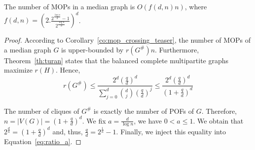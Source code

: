 \documentclass[a4paper,UKenglish,numberwithinsect,cleveref, autoref]{lipics-v2021}
\newcommand{\card}[1]{\left| #1 \right|}
\begin{document}
\begin{corollary}
The number of MOPs in a median graph is $O(f(d,n)n)$, where $f(d,n) = \left(2.\frac{2^{\frac{\log n}{d}}-1}{2^{\frac{\log n}{d}}}\right)^d$.
\label{co:number_mops}
\end{corollary}
\begin{proof}
According to Corollary~\ref{co:mop_crossing_teaser}, the number of MOPs of a median graph $G$ is upper-bounded by $r(G^{\#})n$. Furthermore, Theorem~\ref{th:turan} states that the balanced complete multipartite graphs maximize $r(H)$. Hence,
\begin{equation}
    r(G^{\#})\le \frac{2^d(\frac{q}{d})^d}{\sum_{j=0}^d \binom{d}{j}(\frac{q}{d})^j} \le \frac{2^d(\frac{q}{d})^d}{(1+\frac{q}{d})^d}
    \label{eq:ratio_a}
\end{equation}

The number of cliques of $G^{\#}$ is exactly the number of POFs of $G$. Therefore, $n = \card{V(G)} = (1+\frac{q}{d})^d$. We fix $a = \frac{d}{\log n}$, we have $0 < a \le 1$. We obtain that $2^{\frac{d}{a}} = (1+\frac{q}{d})^d$ and, thus, $\frac{q}{d} = 2^{\frac{1}{a}} - 1$. Finally, we inject this equality into Equation~\eqref{eq:ratio_a}.
\end{proof}
\end{document}

